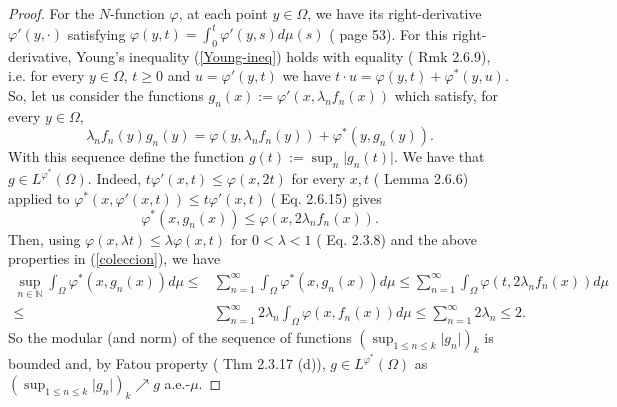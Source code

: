 \documentclass[11pt,a4paper]{amsart}
\newcommand{\lphiconj}{{L^{\varphi^*}(\Omega)}}
\newcommand\boldred[1]{\textcolor{red}{\textbf{#1}}}
\begin{document}
\begin{proof}
    For the $N$-function $\varphi$, at each point $y\in\Omega$, we have its right-derivative $\varphi'(y,\cdot)$ satisfying $\varphi(y,t)=\int_0^t \varphi'(y,s) d\mu(s)$ (\cite{DHHR} page 53). For this right-derivative, Young's inequality (\ref{Young-ineq}) holds with equality (\cite{DHHR} Rmk 2.6.9), i.e. for every $y\in\Omega$, $t\geq 0$ and $u=\varphi'(y,t)$ we have $t\cdot u=\varphi(y,t)+\varphi^*(y,u)$. So, let us consider the functions $g_n(x):=\varphi'(x,\lambda_n f_n(x))$ which satisfy, for every $y\in \Omega$,
    \begin{equation}\label{Young-equality}
        \lambda_n f_n(y) g_n(y)= \varphi(y,\lambda_n f_n(y))+\varphi^*(y,g_n(y)).
    \end{equation}
    With this sequence define the function $g(t):=\sup_n \vert g_n(t)\vert$. We have that $g\in \lphiconj$. Indeed, $t\varphi'(x,t)\leq \varphi(x,2t)$ for every $x,t$ (\cite{DHHR} Lemma 2.6.6) applied to $\varphi^*(x,\varphi'(x,t))\leq t \varphi'(x,t)$ (\cite{DHHR} Eq. 2.6.15) gives
    $$\varphi^*(x,g_n(x))\leq \varphi(x,2\lambda_nf_n(x)).$$
    Then, using $\varphi(x,\lambda t)\leq \lambda \varphi(x,t)$ for $0<\lambda <1$ (\cite{DHHR} Eq. 2.3.8) and the above properties in (\ref{coleccion}), we have
    \begin{align*}
        \sup_{n\in\mathbb{N}}\int_{\Omega} \varphi^*(x, g_n(x)) d\mu
        {\leq}{}   &   \sum_{n=1}^\infty \int_{\Omega}  \varphi^*(x, g_n(x)) d\mu
        {\leq} \sum_{n=1}^\infty \int_{\Omega} \varphi(t,2\lambda_n f_n(x)) d\mu\\
        {\leq}{}   &    \sum_{n=1}^\infty 2\lambda_n\int_{\Omega} \varphi(x, f_n(x)) d\mu
        {\leq} \sum_{n=1}^\infty 2\lambda_n
        \leq  2.
    \end{align*}
    So the modular (and norm) of the sequence of functions $(\sup_{1\leq n\leq k} \vert g_n\vert)_k$ is bounded and, by Fatou property (\cite{DHHR} Thm 2.3.17 (d)), $g\in\lphiconj$ as $(\sup_{1\leq n\leq k} \vert g_n\vert)_k\nearrow g$ a.e.-$\mu$.


\end{proof}
\end{document}
